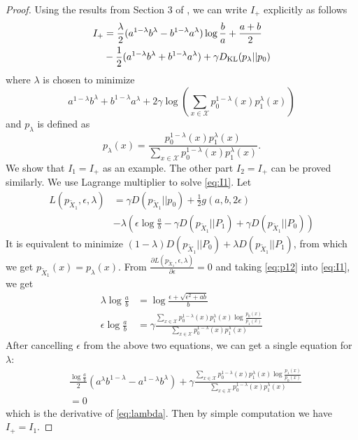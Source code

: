 \documentclass[conference]{IEEEtran}
\begin{document}
	\begin{proof}
Using the results from Section 3 of \cite{abbe17sideinfo}, we can write $I_+$
explicitly as follows
\begin{align}\label{equation:I+}
    I_+ &=\frac{\lambda}{2} (a^{1-\lambda}b^{\lambda} -
    b^{1-\lambda}a^{\lambda})\log\frac{b}{a}+\frac{a+b}{2}\notag \\
    &-\frac{1}{2}(a^{1-\lambda}b^{\lambda} +
    b^{1-\lambda}a^{\lambda})+\gamma D_{\mathrm{KL}}(p_{\lambda}||p_0) 
	\end{align}
	where $\lambda$ is chosen to
	minimize
	\begin{equation}\label{eq:lambda}
     a^{1-\lambda}b^{\lambda} +
    b^{1-\lambda}a^{\lambda} + 2\gamma \log(\sum_{x\in \mathcal{X}}p^{1-\lambda}_0(x) p^{\lambda}_1(x))
\end{equation}
and $p_{\lambda}$ is defined as
\begin{equation}\label{eq:p12}
p_{\lambda}(x)= \frac{p_0^{1-\lambda}(x)p_1^{\lambda}(x)}{\sum_{x \in \mathcal{X}}p_0^{1-\lambda}(x) p_1^{\lambda} (x)}.
\end{equation}
We show that $I_1=I_+$ as an example.
The other part $I_2=I_+$ can be proved
similarly.
We use Lagrange multiplier to solve \eqref{eq:I1}.
Let
\begin{align*}
L(p_{\widetilde{X}_1},\epsilon, \lambda)
&=\gamma D(p_{\widetilde{X}_1}|| p_0)+ \frac{1}{2} g(a,b, 2\epsilon)\\
&- \lambda(\epsilon \log\frac{a}{b}-\gamma
D(p_{\widetilde{X}_1} || P_1) + \gamma D(p_{\widetilde{X}_1} || P_0))
\end{align*}
It is equivalent to minimize
$(1-\lambda)D(p_{\widetilde{X}_1} || P_0) +
\lambda D(p_{\widetilde{X}_1} || P_1) $, from
which we get $p_{\widetilde{X}_1}(x) = p_{\lambda}(x)$.
From $\frac{\partial L(p_{\widetilde{X}_1},\epsilon, \lambda)}{\partial \epsilon}=0$ and taking \eqref{eq:p12}
into \eqref{eq:I1}, we get
\begin{align*}
    \lambda \log \frac{a}{b}
    & = \log \frac{\epsilon + \sqrt{\epsilon^2+ab}}{b} \\
    \epsilon \log \frac{a}{b}
    & = \gamma\frac{\sum_{x \in \mathcal{X}}p_0^{1-\lambda}(x) p_1^{\lambda} (x)\log \frac{p_0(x)}{p_1(x)}}{\sum_{x \in \mathcal{X}}p_0^{1-\lambda}(x) p_1^{\lambda} (x)}
\end{align*}
After cancelling $\epsilon$
from the above two equations, we can get a single equation
for $\lambda$:
\begin{align*}
    &\frac{\log\frac{a}{b}}{2}
    (a^{\lambda} b^{1-\lambda}
    -a^{1-\lambda} b^{\lambda})
    + \gamma \frac{\sum_{x \in \mathcal{X}}p_0^{1-\lambda}(x) p_1^{\lambda} (x)\log \frac{p_1(x)}{p_0(x)}}{\sum_{x \in \mathcal{X}}p_0^{1-\lambda}(x) p_1^{\lambda} (x)}\\
    &=0
\end{align*}
which is the derivative of \eqref{eq:lambda}.
Then by simple computation we have
$I_+ = I_1$. 
\end{proof}
\end{document}
